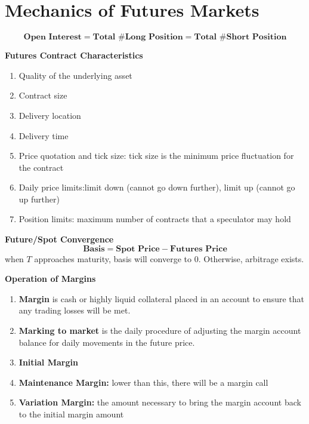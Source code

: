 \documentclass[11pt,fleqn]{report} %
\numberwithin{equation}{section} %
\numberwithin{figure}{section} %
\numberwithin{table}{section} %
\begin{document}
\chapter{Mechanics of Futures Markets}
$$
\textbf{Open Interest}=\textbf{Total \# Long Position}=\textbf{Total \# Short Position}
$$
\begin{definition}\textbf{Futures Contract Characteristics}
\begin{enumerate}
    \item Quality of the underlying asset
    \item Contract size
    \item Delivery location
    \item Delivery time
    \item Price quotation and tick size: tick size is the minimum price fluctuation for the contract
    \item Daily price limits:limit down (cannot go down further), limit up (cannot go up further)
    \item Position limits: maximum number of contracts that a speculator may hold
\end{enumerate}
\end{definition}
\begin{theorem}\textbf{Future/Spot Convergence}\\
$$
\textbf{Basis}=\textbf{Spot Price}-\textbf{Futures Price}
$$
when $T$ approaches maturity, basis will converge to $0$. Otherwise, arbitrage exists.
\end{theorem}
\begin{definition}\textbf{Operation of Margins}
\begin{enumerate}
    \item \textbf{Margin} is cash or highly liquid collateral placed in an account to ensure that any trading losses will be met.
    \item \textbf{Marking to market} is the daily procedure of adjusting the margin account balance for daily movements in the future price.
    \item \textbf{Initial Margin}
    \item \textbf{Maintenance Margin:} lower than this, there will be a margin call
    \item \textbf{Variation Margin:} the amount necessary to bring the margin account back to the initial margin amount
\end{enumerate}
\end{definition}
\end{document}
